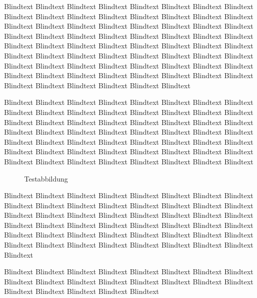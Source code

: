 Blindtext Blindtext Blindtext Blindtext Blindtext Blindtext Blindtext
Blindtext Blindtext Blindtext Blindtext Blindtext Blindtext Blindtext
Blindtext Blindtext Blindtext Blindtext Blindtext Blindtext Blindtext
Blindtext Blindtext Blindtext Blindtext Blindtext Blindtext Blindtext
Blindtext Blindtext Blindtext Blindtext Blindtext Blindtext Blindtext
Blindtext Blindtext Blindtext Blindtext Blindtext Blindtext Blindtext
Blindtext Blindtext Blindtext Blindtext Blindtext Blindtext Blindtext
Blindtext Blindtext Blindtext Blindtext Blindtext Blindtext Blindtext
Blindtext Blindtext Blindtext Blindtext Blindtext Blindtext Blindtext
Blindtext Blindtext Blindtext Blindtext Blindtext Blindtext Blindtext

Blindtext Blindtext Blindtext Blindtext Blindtext Blindtext Blindtext
Blindtext Blindtext Blindtext Blindtext Blindtext Blindtext Blindtext
Blindtext Blindtext Blindtext Blindtext Blindtext Blindtext Blindtext
Blindtext Blindtext Blindtext Blindtext Blindtext Blindtext Blindtext
Blindtext Blindtext Blindtext Blindtext Blindtext Blindtext Blindtext
Blindtext Blindtext Blindtext Blindtext Blindtext Blindtext Blindtext
Blindtext Blindtext Blindtext Blindtext Blindtext Blindtext Blindtext
Blindtext Blindtext Blindtext Blindtext Blindtext Blindtext Blindtext

\begin{figure}[!htbp]
  \centering
  \caption{Testabbildung}
  \label{fig:test}
\end{figure}

Blindtext Blindtext Blindtext Blindtext Blindtext Blindtext Blindtext
Blindtext Blindtext Blindtext Blindtext Blindtext Blindtext Blindtext
Blindtext Blindtext Blindtext Blindtext Blindtext Blindtext Blindtext
Blindtext Blindtext Blindtext Blindtext Blindtext Blindtext Blindtext
Blindtext Blindtext Blindtext Blindtext Blindtext Blindtext Blindtext
Blindtext Blindtext Blindtext Blindtext Blindtext Blindtext Blindtext
Blindtext Blindtext Blindtext Blindtext Blindtext Blindtext Blindtext

Blindtext Blindtext Blindtext Blindtext Blindtext Blindtext Blindtext
Blindtext Blindtext Blindtext Blindtext Blindtext Blindtext Blindtext
Blindtext Blindtext Blindtext Blindtext Blindtext Blindtext Blindtext

